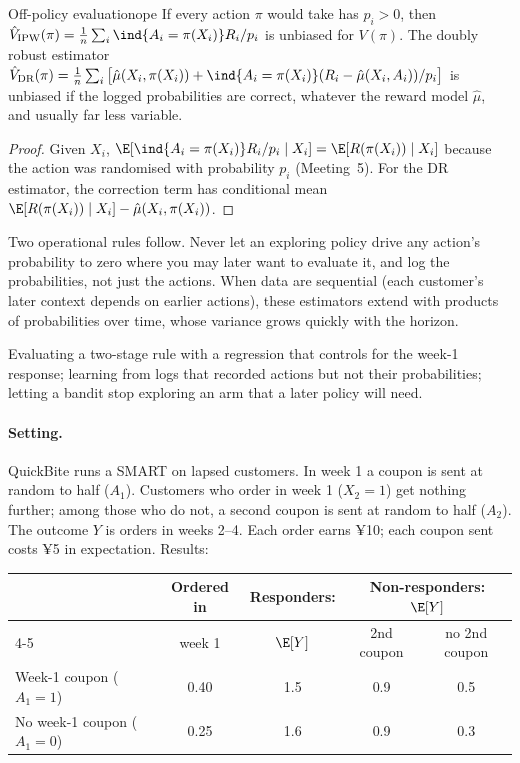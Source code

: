 \documentclass[11pt]{article}
\begin{document}
\begin{prop}{Off-policy evaluation}{ope}
If every action $\pi$ would take has $p_i > 0$, then $\hat V_{\text{IPW}}(\pi) = \frac1n\sum_i \ind{A_i = \pi(X_i)}R_i/p_i$ is unbiased for
$V(\pi)$. The doubly robust estimator
$\hat V_{\text{DR}}(\pi) = \frac1n\sum_i\big[\hat\mu(X_i, \pi(X_i)) + \ind{A_i = \pi(X_i)}(R_i - \hat\mu(X_i, A_i))/p_i\big]$ is unbiased if the logged
probabilities are correct, whatever the reward model $\hat\mu$, and usually far less variable.
\end{prop}
\begin{proof}
Given $X_i$, $\E[\ind{A_i = \pi(X_i)}R_i/p_i \mid X_i] = \E[R(\pi(X_i)) \mid X_i]$ because the action was randomised with probability
$p_i$ (Meeting~5). For the DR estimator, the correction term has conditional mean $\E[R(\pi(X_i)) \mid X_i] - \hat\mu(X_i, \pi(X_i))$.
\end{proof}

Two operational rules follow. Never let an exploring policy drive any action's probability to zero where you may later want
to evaluate it, and log the probabilities, not just the actions. When data are sequential (each customer's later context
depends on earlier actions), these estimators extend with products of probabilities over time, whose variance grows quickly
with the horizon.

\begin{pitfall}
Evaluating a two-stage rule with a regression that controls for the week-1 response; learning from logs that recorded
actions but not their probabilities; letting a bandit stop exploring an arm that a later policy will need.
\end{pitfall}

\sectiontwo

\paragraph{Setting.} QuickBite runs a SMART on lapsed customers. In week 1 a coupon is sent at random to half ($A_1$). Customers
who order in week 1 ($X_2 = 1$) get nothing further; among those who do not, a second coupon is sent at random to half ($A_2$).
The outcome $Y$ is orders in weeks 2--4. Each order earns ¥10; each coupon sent costs ¥5 in expectation. Results:
\begin{center}
\begin{tabular}{lcccc}
\toprule
& Ordered in & Responders: & \multicolumn{2}{c}{Non-responders: $\E[Y]$} \\
\cmidrule(lr){4-5}
& week 1 & $\E[Y]$ & 2nd coupon & no 2nd coupon \\
\midrule
Week-1 coupon ($A_1 = 1$) & 0.40 & 1.5 & 0.9 & 0.5 \\
No week-1 coupon ($A_1 = 0$) & 0.25 & 1.6 & 0.9 & 0.3 \\
\bottomrule
\end{tabular}
\end{center}
\end{document}
